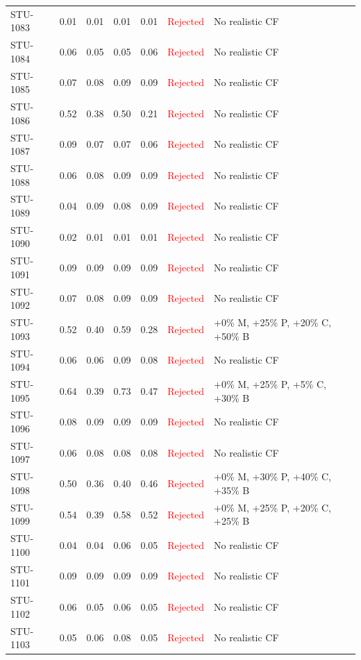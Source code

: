 \begin{longtable}{l c c c c | c | l}
STU-1083 & 0.01 & 0.01 & 0.01 & 0.01 & \textcolor{red}{Rejected} & No realistic CF \\
STU-1084 & 0.06 & 0.05 & 0.05 & 0.06 & \textcolor{red}{Rejected} & No realistic CF \\
STU-1085 & 0.07 & 0.08 & 0.09 & 0.09 & \textcolor{red}{Rejected} & No realistic CF \\
STU-1086 & 0.52 & 0.38 & 0.50 & 0.21 & \textcolor{red}{Rejected} & No realistic CF \\
STU-1087 & 0.09 & 0.07 & 0.07 & 0.06 & \textcolor{red}{Rejected} & No realistic CF \\
STU-1088 & 0.06 & 0.08 & 0.09 & 0.09 & \textcolor{red}{Rejected} & No realistic CF \\
STU-1089 & 0.04 & 0.09 & 0.08 & 0.09 & \textcolor{red}{Rejected} & No realistic CF \\
STU-1090 & 0.02 & 0.01 & 0.01 & 0.01 & \textcolor{red}{Rejected} & No realistic CF \\
STU-1091 & 0.09 & 0.09 & 0.09 & 0.09 & \textcolor{red}{Rejected} & No realistic CF \\
STU-1092 & 0.07 & 0.08 & 0.09 & 0.09 & \textcolor{red}{Rejected} & No realistic CF \\
STU-1093 & 0.52 & 0.40 & 0.59 & 0.28 & \textcolor{red}{Rejected} & +0\% M, +25\% P, +20\% C, +50\% B \\
STU-1094 & 0.06 & 0.06 & 0.09 & 0.08 & \textcolor{red}{Rejected} & No realistic CF \\
STU-1095 & 0.64 & 0.39 & 0.73 & 0.47 & \textcolor{red}{Rejected} & +0\% M, +25\% P, +5\% C, +30\% B \\
STU-1096 & 0.08 & 0.09 & 0.09 & 0.09 & \textcolor{red}{Rejected} & No realistic CF \\
STU-1097 & 0.06 & 0.08 & 0.08 & 0.08 & \textcolor{red}{Rejected} & No realistic CF \\
STU-1098 & 0.50 & 0.36 & 0.40 & 0.46 & \textcolor{red}{Rejected} & +0\% M, +30\% P, +40\% C, +35\% B \\
STU-1099 & 0.54 & 0.39 & 0.58 & 0.52 & \textcolor{red}{Rejected} & +0\% M, +25\% P, +20\% C, +25\% B \\
STU-1100 & 0.04 & 0.04 & 0.06 & 0.05 & \textcolor{red}{Rejected} & No realistic CF \\
STU-1101 & 0.09 & 0.09 & 0.09 & 0.09 & \textcolor{red}{Rejected} & No realistic CF \\
STU-1102 & 0.06 & 0.05 & 0.06 & 0.05 & \textcolor{red}{Rejected} & No realistic CF \\
STU-1103 & 0.05 & 0.06 & 0.08 & 0.05 & \textcolor{red}{Rejected} & No realistic CF \\

\end{longtable}

